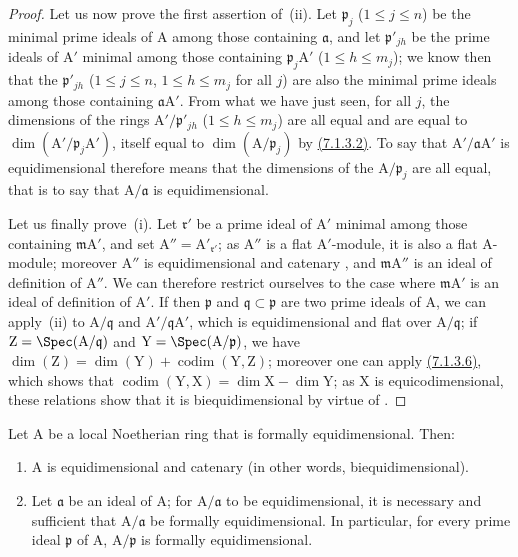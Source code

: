 \begin{proof}
Let us now prove the first assertion of~(ii).
Let $\mathfrak{p}_j$ ($1\leqslant j\leqslant n$) be the minimal prime ideals of $\mathrm{A}$ among those containing $\mathfrak{a}$, and let $\mathfrak{p}'_{jh}$ be the prime ideals of $\mathrm{A}'$ minimal among those containing $\mathfrak{p}_j\mathrm{A}'$ ($1\leqslant h\leqslant m_j$); we know then  that the $\mathfrak{p}'_{jh}$ ($1\leqslant j\leqslant n$, $1\leqslant h\leqslant m_j$ for all $j$) are also the minimal prime ideals among those containing $\mathfrak{a}\mathrm{A}'$.
From what we have just seen, for all $j$, the dimensions of the rings $\mathrm{A}'/\mathfrak{p}'_{jh}$ ($1\leqslant h\leqslant m_j$) are all equal and are equal to $\dim(\mathrm{A}'/\mathfrak{p}_j\mathrm{A}')$, itself equal to $\dim(\mathrm{A}/\mathfrak{p}_j)$ by {\hyperlink{ega4.c04.eq.7-1-3-2}{(7.1.3.2)}}.
To say that $\mathrm{A}'/\mathfrak{a}\mathrm{A}'$ is equidimensional therefore means that the dimensions of the $\mathrm{A}/\mathfrak{p}_j$ are all equal, that is to say that $\mathrm{A}/\mathfrak{a}$ is equidimensional.

Let us finally prove~(i).
Let $\mathfrak{r}'$ be a prime ideal of $\mathrm{A}'$ minimal among those containing $\mathfrak{m}\mathrm{A}'$, and set $\mathrm{A}''=\mathrm{A}'_{\mathfrak{r}'}$; as $\mathrm{A}''$ is a flat $\mathrm{A}'$-module, it is also a flat $\mathrm{A}$-module; moreover $\mathrm{A}''$ is equidimensional and catenary , and $\mathfrak{m}\mathrm{A}''$ is an ideal of definition of $\mathrm{A}''$.
We can therefore restrict ourselves to the case where $\mathfrak{m}\mathrm{A}'$ is an ideal of definition of $\mathrm{A}'$.
If then $\mathfrak{p}$ and $\mathfrak{q}\subset\mathfrak{p}$ are two prime ideals of $\mathrm{A}$, we can apply~(ii) to $\mathrm{A}/\mathfrak{q}$ and $\mathrm{A}'/\mathfrak{q}\mathrm{A}'$, which is equidimensional and flat over $\mathrm{A}/\mathfrak{q}$; if $\mathrm{Z}=\Spec(\mathrm{A}/\mathfrak{q})$ and $\mathrm{Y}=\Spec(\mathrm{A}/\mathfrak{p})$, we have
$\dim(\mathrm{Z})=\dim(\mathrm{Y})+\operatorname{codim}(\mathrm{Y},\mathrm{Z})$;
moreover one can apply {\hyperlink{ega4.c04.eq.7-1-3-6}{(7.1.3.6)}}, which shows that $\operatorname{codim}(\mathrm{Y},\mathrm{X})=\dim\mathrm{X}-\dim\mathrm{Y}$; as $\mathrm{X}$ is equicodimensional, these relations show that it is biequidimensional by virtue of .
\end{proof}

\begin{corollary}[7.1.4]
\label{IV.7.1.4}
Let $\mathrm{A}$ be a local Noetherian ring that is formally equidimensional.
Then:
\begin{enumerate}[label=\emph{\roman*)}]
  \item $\mathrm{A}$ is equidimensional and catenary (in other words, biequidimensional).
  \item Let $\mathfrak{a}$ be an ideal of $\mathrm{A}$; for $\mathrm{A}/\mathfrak{a}$ to be equidimensional, it is necessary and sufficient that $\mathrm{A}/\mathfrak{a}$ be formally equidimensional.
  In particular, for every prime ideal $\mathfrak{p}$ of $\mathrm{A}$, $\mathrm{A}/\mathfrak{p}$ is formally equidimensional.
\end{enumerate}
\end{corollary}

